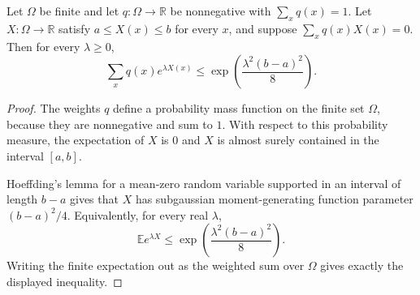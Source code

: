 \begin{helper}
Let \(\Omega\) be finite and let \(q:\Omega\to\mathbb R\) be nonnegative with
\(\sum_x q(x)=1\).  Let \(X:\Omega\to\mathbb R\) satisfy
\(a\le X(x)\le b\) for every \(x\), and suppose
\(\sum_x q(x)X(x)=0\).  Then for every \(\lambda\ge0\),
\[
\sum_x q(x)e^{\lambda X(x)}
\le
\exp\!\left(\frac{\lambda^2(b-a)^2}{8}\right).
\]
\end{helper}
\begin{proof}
The weights \(q\) define a probability mass function on the finite set
\(\Omega\), because they are nonnegative and sum to \(1\).  With respect to
this probability measure, the expectation of \(X\) is \(0\) and \(X\) is
almost surely contained in the interval \([a,b]\).

Hoeffding's lemma for a mean-zero random variable supported in an interval of
length \(b-a\) gives that \(X\) has subgaussian moment-generating function
parameter \((b-a)^2/4\).  Equivalently, for every real \(\lambda\),
\[
\mathbb E e^{\lambda X}
\le
\exp\!\left(\frac{\lambda^2(b-a)^2}{8}\right).
\]
Writing the finite expectation out as the weighted sum over \(\Omega\) gives
exactly the displayed inequality.
\end{proof}
